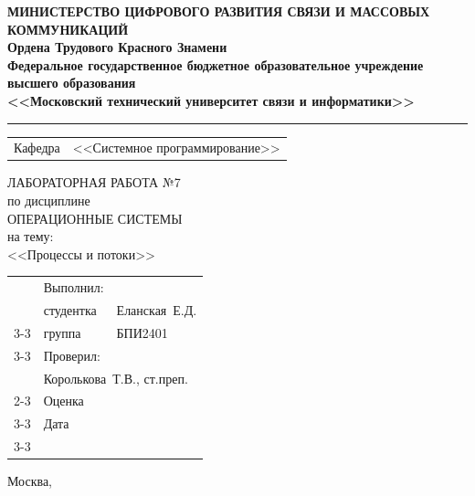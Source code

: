 \thispagestyle{empty}

\begin{center}
	\textbf{МИНИСТЕРСТВО ЦИФРОВОГО РАЗВИТИЯ СВЯЗИ И МАССОВЫХ КОММУНИКАЦИЙ} \\
	\textbf{Ордена Трудового Красного Знамени \\
		Федеральное государственное бюджетное образовательное учреждение высшего образования \\
		<<Московский технический университет связи и информатики>>}
\end{center}
\rule{\linewidth}{1pt}

\vspace{0.3em}

\begin{center}
	\begin{tabularx}{0.6\textwidth}{p{1.2cm}X}
		Кафедра & \quad <<Системное программирование>> \\%
	\end{tabularx}
\end{center}

\vspace{10em}

\begin{center}
	\Large
	ЛАБОРАТОРНАЯ РАБОТА №7 \\
	\large
	по дисциплине \\
	ОПЕРАЦИОННЫЕ СИСТЕМЫ \\
	на тему: \\
	<<Процессы и потоки>>
\end{center}

\vspace{4em}

\renewcommand{\arraystretch}{1.1}
\begin{tabularx}{\textwidth}{p{10cm}p{2cm}p{3cm}}
	& Выполнил: & \\
	& студентка & Еланская~Е.Д. \\\cline{3-3} 
	& группа & БПИ2401 \\\cline{3-3} 
	& Проверил: &  \\
	& \multicolumn{2}{l}{Королькова~Т.В., ст.преп.} \\\cline{2-3}
	& Оценка & \\\cline{3-3} 
	& Дата & \\\cline{3-3} 
\end{tabularx}

\vspace{5em}

\begin{center}
	Москва,~\the\year
\end{center}
\clearpage


